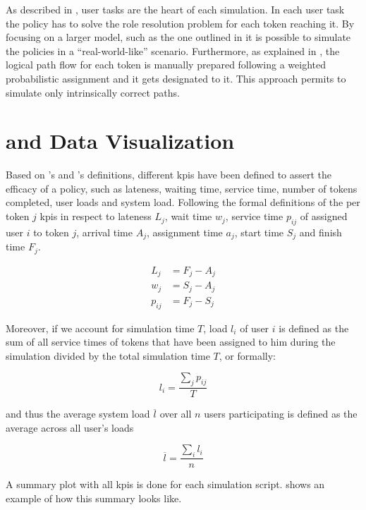 As described in , user tasks are the heart of each simulation. In each user task the policy has to solve the role resolution problem for each token reaching it. By focusing on a larger model, such as the one outlined in  it is possible to simulate the policies in a ``real-world-like'' scenario. Furthermore, as explained in , the logical path flow for each token is manually prepared following a weighted probabilistic assignment and it gets designated to it. This approach permits to simulate only intrinsically correct paths. 

\section{ and Data Visualization}

Based on \citet{Pinedo2008}'s and \citet{Zeng2005}'s definitions, different \glspl{kpi} have been defined to assert the efficacy of a policy, such as lateness, waiting time, service time, number of tokens completed, user loads and system load. Following the formal definitions of the per token $j$ \glspl{kpi} in respect to lateness $L_j$, wait time $w_j$, service time $p_{ij}$ of assigned user $i$ to token $j$, arrival time $A_j$, assignment time $a_j$, start time $S_j$ and finish time $F_j$.

\begin{align}
	L_j&=F_j-A_j \label{eq:lateness}\\
	w_j&=S_j-A_j \\
	p_{ij}&=F_j-S_j
\end{align}

Moreover, if we account for simulation time $T$, load $l_i$ of user $i$ is defined as the sum of all service times of tokens that have been assigned to him during the simulation divided by the total simulation time $T$, or formally:

\begin{equation}
	l_i=\frac{\sum_j p_{ij}}{T}
\end{equation}

and thus the average system load $\overline{l}$ over all $n$ users participating is defined as the average across all user's loads \ie

\begin{equation}
	\overline{l} = \frac{\sum_i l_i}{n}
\end{equation}

A summary plot with all \glspl{kpi} is done for each simulation script.  shows an example of how this summary looks like.

